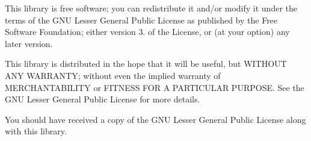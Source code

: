 This library is free software; you can redistribute it and/or modify it under the terms of the G\-N\-U Lesser General Public License as published by the Free Software Foundation; either version 3. of the License, or (at your option) any later version.

This library is distributed in the hope that it will be useful, but W\-I\-T\-H\-O\-U\-T A\-N\-Y W\-A\-R\-R\-A\-N\-T\-Y; without even the implied warranty of M\-E\-R\-C\-H\-A\-N\-T\-A\-B\-I\-L\-I\-T\-Y or F\-I\-T\-N\-E\-S\-S F\-O\-R A P\-A\-R\-T\-I\-C\-U\-L\-A\-R P\-U\-R\-P\-O\-S\-E. See the G\-N\-U Lesser General Public License for more details.

You should have received a copy of the G\-N\-U Lesser General Public License along with this library. 